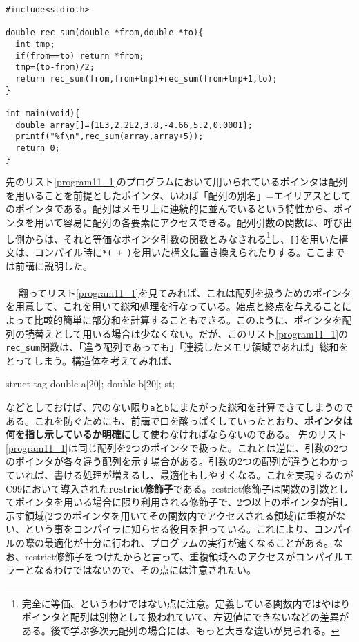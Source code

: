 \begin{boxnote}
\begin{lstlisting}[caption=分割統治法による総和,label=program11_1]
#include<stdio.h>

double rec_sum(double *from,double *to){
  int tmp;
  if(from==to) return *from;
  tmp=(to-from)/2;
  return rec_sum(from,from+tmp)+rec_sum(from+tmp+1,to);
}

int main(void){
  double array[]={1E3,2.2E2,3.8,-4.66,5.2,0.0001};
  printf("%f\n",rec_sum(array,array+5));
  return 0;
}
\end{lstlisting}
\end{boxnote}
先のリスト\ref{program11_1}のプログラムにおいて用いられているポインタは配列を用いることを前提としたポインタ、いわば「配列の別名」=エイリアスとしてのポインタである。配列はメモリ上に連続的に並んでいるという特性から、ポインタを用いて容易に配列の各要素にアクセスできる。配列引数の関数は、呼び出し側からは、それと等価なポインタ引数の関数とみなされる\footnote{完全に等価、というわけではない点に注意。定義している関数内ではやはりポインタと配列は別物として扱われていて、左辺値にできないなどの差異がある。後で学ぶ多次元配列の場合には、もっと大きな違いが見られる。}し、\verb|[]|を用いた構文は、コンパイル時に\verb|*( + )|を用いた構文に置き換えられたりする。ここまでは前講に説明した。
\\ \\　
翻ってリスト\ref{program11_1}を見てみれば、これは配列を扱うためのポインタを用意して、これを用いて総和処理を行なっている。始点と終点を与えることによって比較的簡単に部分和を計算することもできる。このように、ポインタを配列の読替えとして用いる場合は少なくない。だが、このリスト\ref{program11_1}の\verb|rec_sum|関数は、「違う配列であっても」「連続したメモリ領域であれば」総和をとってしまう。構造体を考えてみれば、
\begin{code}
struct tag{
  double a[20];
  double b[20];
}st;
\end{code}
などとしておけば、穴のない限り\verb|a|と\verb|b|にまたがった総和を計算できてしまうのである。これを防ぐためにも、前講で口を酸っぱくしていったとおり、\textbf{ポインタは何を指し示しているか明確に}して使わなければならないのである。
先のリスト\ref{program11_1}は同じ配列を2つのポインタで扱った。これとは逆に、引数の2つのポインタが各々違う配列を示す場合がある。引数の2つの配列が違うとわかっていれば、書ける処理が増えるし、最適化もしやすくなる。これを実現するのがC99において導入された\textbf{restrict修飾子}である。restrict修飾子は関数の引数としてポインタを用いる場合に限り利用される修飾子で、2つ以上のポインタが指し示す領域(2つのポインタを用いてその関数内でアクセスされる領域)に重複がない、という事をコンパイラに知らせる役目を担っている。これにより、コンパイルの際の最適化が十分に行われ、プログラムの実行が速くなることがある。なお、restrict修飾子をつけたからと言って、重複領域へのアクセスがコンパイルエラーとなるわけではないので、その点には注意されたい。
